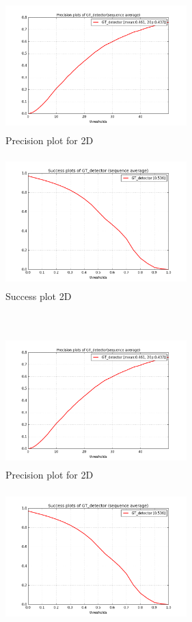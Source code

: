 \documentclass[10pt,twocolumn,letterpaper]{article}
\begin{document}
\begin{figure}[t]
   \centering
    \begin{subfigure}[c]{0.4\textwidth}
    \centering
    \includegraphics[width=7cm,height=5cm, clip]{figures/precision_plot.png}
    \caption{\small{Precision plot for 2D}}
    \end{subfigure}%
    \begin{subfigure}[c]{0.4\textwidth}
    \centering
        \includegraphics[width=7cm,height=5cm, clip]{figures/success_plot.png}
        \caption{\small{Success plot 2D}}
    \end{subfigure}
    \\
     \begin{subfigure}[c]{0.4\textwidth}
     \includegraphics[width=7cm,height=5cm, clip]{figures/precision_plot.png}
    \caption{\small{Precision plot for 2D}}
    \end{subfigure}%
    \begin{subfigure}[c]{0.4\textwidth}
    \centering
        \includegraphics[width=7cm,height=5cm, clip]{figures/success_plot.png}

\end{subfigure}
\end{figure}
\end{document}
